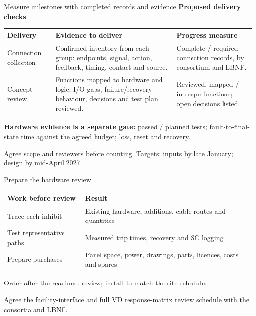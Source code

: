 \begin{frame}{Measure milestones with completed records and evidence}
\textbf{Proposed delivery checks}\par\medskip
\renewcommand{\arraystretch}{1.25}
\begin{tabularx}{\textwidth}{@{}>{\RaggedRight\arraybackslash}p{2.8cm}>{\RaggedRight\arraybackslash}p{6.1cm}>{\RaggedRight\arraybackslash}X@{}}
\toprule
\textbf{Delivery} & \textbf{Evidence to deliver} & \textbf{Progress measure}\\\midrule
Connection collection & Confirmed inventory from each group: endpoints, signal, action, feedback, timing, contact and source. & Complete / required connection records, by consortium and LBNF.\\
Concept review & Functions mapped to hardware and logic; I/O gaps, failure/recovery behaviour, decisions and test plan reviewed. & Reviewed, mapped / in-scope functions; open decisions listed.\\
\bottomrule
\end{tabularx}\par\smallskip
\textbf{Hardware evidence is a separate gate:} passed / planned tests; fault-to-final-state time against the agreed budget; loss, reset and recovery.\par\smallskip
Agree scope and reviewers before counting. Targets: inputs by late January; design by mid-April 2027.
\end{frame}

\begin{frame}{Prepare the hardware review}
\renewcommand{\arraystretch}{1.45}
\begin{tabularx}{\textwidth}{@{}>{\RaggedRight\arraybackslash}p{3.4cm}>{\RaggedRight\arraybackslash}X@{}}
\toprule
\textbf{Work before review} & \textbf{Result}\\\midrule
Trace each inhibit & Existing hardware, additions, cable routes and quantities\\
Test representative paths & Measured trip times, recovery and SC logging\\
Prepare purchases & Panel space, power, drawings, parts, licences, costs and spares\\
\bottomrule
\end{tabularx}\par\bigskip
Order after the readiness review; install to match the site schedule.\par\medskip
Agree the facility-interface and full VD response-matrix review schedule with the consortia and LBNF.
\end{frame}
